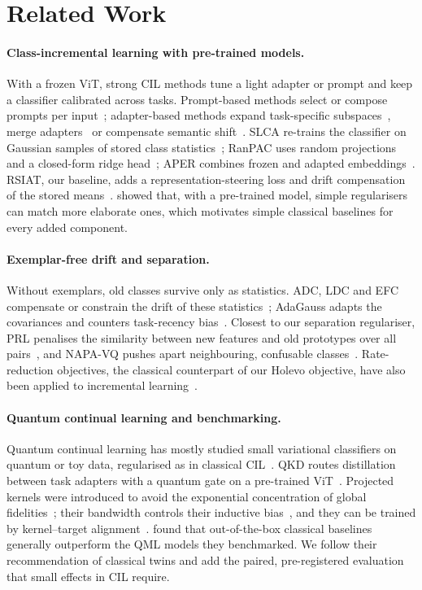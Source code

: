 \section{Related Work}
\label{sec:related}

\paragraph{Class-incremental learning with pre-trained models.}
With a frozen ViT, strong CIL methods tune a light adapter or prompt and keep
a classifier calibrated across tasks. Prompt-based methods select or compose
prompts per input~\citep{l2p,dualprompt,codaprompt}; adapter-based methods
expand task-specific subspaces~\citep{ease}, merge adapters~\citep{mos} or
compensate semantic shift~\citep{ssiat}. SLCA re-trains the classifier on Gaussian
samples of stored class statistics~\citep{zhang2023slca}; RanPAC uses random
projections and a closed-form ridge head~\citep{mcdonnell2023ranpac}; APER
combines frozen and adapted embeddings~\citep{zhou2024aper}. RSIAT, our
baseline, adds a representation-steering loss and drift compensation of the
stored means~\citep{rsiat}. \citet{smith2023closer} showed that, with a
pre-trained model, simple regularisers can match more elaborate ones, which
motivates simple classical baselines for every added component.

\paragraph{Exemplar-free drift and separation.}
Without exemplars, old classes survive only as statistics. ADC, LDC and EFC
compensate or constrain the drift of these
statistics~\citep{goswami2024adc,gomezvilla2024ldc,magistri2024efc}; AdaGauss
adapts the covariances and counters task-recency
bias~\citep{rypesc2024adagauss}. Closest to our separation regulariser,
PRL penalises the similarity between new features and old prototypes over all
pairs~\citep{shi2024prl}, and NAPA-VQ pushes apart neighbouring, confusable
classes~\citep{malepathirana2023napavq}. Rate-reduction objectives, the
classical counterpart of our Holevo objective, have also been applied to
incremental learning~\citep{wu2021rate}.

\paragraph{Quantum continual learning and benchmarking.}
Quantum continual learning has mostly studied small variational classifiers on
quantum or toy data, regularised as in classical
CIL~\citep{jiang2022qcl}. QKD routes distillation between task adapters with a
quantum gate on a pre-trained ViT~\citep{li2026qkd}. Projected kernels were
introduced to avoid the exponential concentration of global
fidelities~\citep{huang2021power,thanasilp2024concentration}; their bandwidth
controls their inductive bias~\citep{shaydulin2022bandwidth,canatar2022bandwidth},
and they can be trained by kernel--target alignment~\citep{hubregtsen2022qek}.
\citet{bowles2024better} found that out-of-the-box classical baselines
generally outperform the QML models they benchmarked. We follow their
recommendation of classical twins and add the paired, pre-registered
evaluation that small effects in CIL require.

